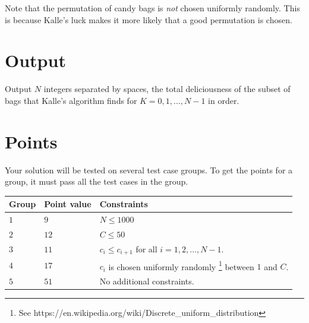 Note that the permutation of candy bags is \textit{not} chosen uniformly randomly. This is because Kalle's luck makes it more
likely that a good permutation is chosen.


\section*{Output}
Output $N$ integers separated by spaces, the total deliciousness of the subset of bags that Kalle's
algorithm finds for $K=0,1,\dots,N-1$ in order. 

\section*{Points}
Your solution will be tested on several test case groups.
To get the points for a group, it must pass all the test cases in the group.

\noindent
\begin{tabular}{| l | l | p{12cm} |}
  \hline
  \textbf{Group} & \textbf{Point value} & \textbf{Constraints} \\ \hline
  $1$    & $9$        & $N \leq 1000$ \\ \hline
  $2$    & $12$       & $C \leq 50$ \\ \hline
  $3$    & $11$       & $c_i \leq c_{i+1}$ for all $i=1,2,\dots,N-1$. \\ \hline
  $4$    & $17$       & $c_i$ is chosen uniformly randomly \footnote{See https://en.wikipedia.org/wiki/Discrete\_uniform\_distribution} between $1$ and $C$. \\ \hline
  $5$    & $51$       & No additional constraints. \\ \hline
\end{tabular}

